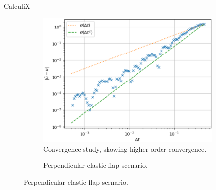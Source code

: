 \documentclass[
  english,            %
  aspectratio=43,    %
]{tumbeamer}
\begin{document}
\begin{frame}{CalculiX}
\begin{figure}[!ht]
    \centering
    \begin{subfigure}[b]{0.5\textwidth}
        \includegraphics[width=\textwidth]{resources/calculix_convergence_study.png}
        \caption{Convergence study, showing higher-order convergence.}
    \end{subfigure}
    \hspace{0.8cm}
    \begin{subfigure}[b]{0.35\textwidth}
        \caption{Perpendicular elastic flap scenario.}
    \end{subfigure}
    \label{fig:calculix_convergence}
\end{figure}
\end{frame}
\end{document}
